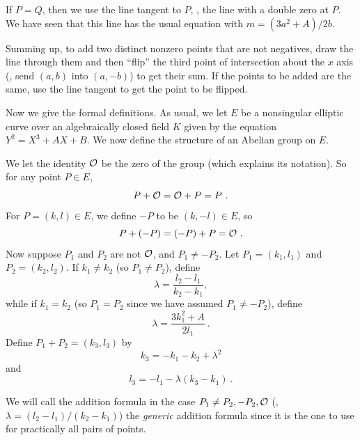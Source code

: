 If $P=Q$, then we use the line tangent to $P$, \ie, the line with a double zero at $P$. We have seen that this line has the usual equation with $m=(3a^{2}+A)/2b$.

Summing up, to add two distinct nonzero points that are not negatives, draw the line through them and then ``flip'' the third point of intersection about the $x$ axis (\ie, send $(a, b)$ into $(a, -b)$) to get their sum. If the points to be added are the same, use the line tangent to get the point to be flipped.

Now we give the formal definitions. As usual, we let $E$ be a nonsingular elliptic curve over an algebraically closed field $K$ given by the equation $Y^{2}= X^{3}+AX+B$. We now define the structure of an Abelian group on $E$.

\begin{defi}
\label{d6.1}
We let the identity $\mathcal{O}$ be the zero of the group (which explains its notation). So for any point $P\in E$,
$$
P+\mathcal{O}=\mathcal{O}+P=P\ .
$$
For $P=(k,l) \in E$, we define $-P$ to be $(k,-l)\in E$, so
$$
P+(-P)=(-P)+P=\mathcal{O}\ .
$$
Now suppose $P_{1}$ and $P_{2}$ are not $\mathcal{O}$, and $P_{1}\neq-P_{2}$. Let $P_{1}=(k_{1},l_{1})$ and $P_{2}=(k_{2},l_{2})$. If $k_{1}\neq k_{2}$ (so $P_{1}\neq P_{2}$), define
$$
\lambda=\frac{l_{2}-l_{1}}{k_{2}-k_{1}},
$$
while if $k_{1}=k_{2}$ (so $P_{1}=P_{2}$ since we have assumed $P_{1}\neq-P_{2}$), define
$$
\lambda=\frac{3k_{1}^{2}+A}{2l_{1}}\ .
$$
Define $P_{1}+P_{2}=(k_{3},l_{3})$ by
$$
k_{3}=-k_{1}-k_{2}+\lambda^{2}
$$
and
$$
l_{3}=-l_{1}-\lambda(k_{3}-k_{1})\ .
$$
\end{defi}
We will call the addition formula in the case $P_{1}\neq P_{2}, -P_{2},\mathcal{O}$ (\ie, $\lambda= (l_{2}-l_{1})/(k_{2}-k_{1})$) the {\it generic} addition formula since it is the one to use for practically all pairs of points.

\bigskip

